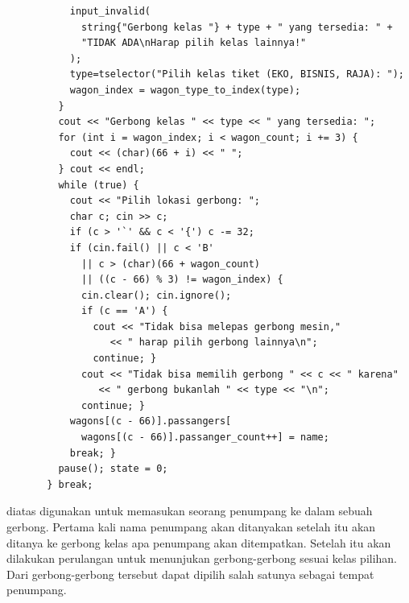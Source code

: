 \documentclass[../main.tex]{subfiles}
\begin{document}
\begin{lstlisting}
           input_invalid(
             string{"Gerbong kelas "} + type + " yang tersedia: " +
             "TIDAK ADA\nHarap pilih kelas lainnya!"
           );
           type=tselector("Pilih kelas tiket (EKO, BISNIS, RAJA): ");
           wagon_index = wagon_type_to_index(type);
         }
         cout << "Gerbong kelas " << type << " yang tersedia: ";
         for (int i = wagon_index; i < wagon_count; i += 3) {
           cout << (char)(66 + i) << " ";
         } cout << endl;
         while (true) {
           cout << "Pilih lokasi gerbong: ";
           char c; cin >> c;
           if (c > '`' && c < '{') c -= 32;
           if (cin.fail() || c < 'B'
             || c > (char)(66 + wagon_count)
             || ((c - 66) % 3) != wagon_index) {
             cin.clear(); cin.ignore();
             if (c == 'A') {
               cout << "Tidak bisa melepas gerbong mesin,"
                  << " harap pilih gerbong lainnya\n";
               continue; }
             cout << "Tidak bisa memilih gerbong " << c << " karena"
                << " gerbong bukanlah " << type << "\n";
             continue; }
           wagons[(c - 66)].passangers[
             wagons[(c - 66)].passanger_count++] = name;
           break; }
         pause(); state = 0;
       } break;
\end{lstlisting}
    \vspace{-0.15ex}
    \ilz{}{\Script} diatas digunakan untuk memasukan seorang penumpang ke dalam sebuah gerbong. Pertama kali nama penumpang akan ditanyakan setelah itu akan ditanya ke gerbong kelas apa penumpang akan ditempatkan. Setelah itu akan dilakukan perulangan untuk menunjukan gerbong-gerbong sesuai kelas pilihan. Dari gerbong-gerbong tersebut dapat dipilih salah satunya sebagai tempat penumpang.
\end{document}
